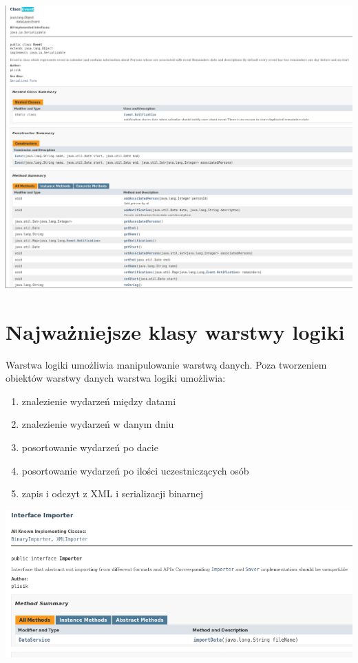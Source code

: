 \documentclass[a4paper,12pt]{article}
\begin{document}
\begin{minipage}{\textwidth}

    \includegraphics[width=\textwidth]{./screen/dataLayer/Event.png}
    \label{Event}

\end{minipage}


\section{Najważniejsze klasy warstwy logiki}
       Warstwa logiki umożliwia manipulowanie warstwą danych. Poza tworzeniem obiektów warstwy danych warstwa logiki umożliwia:
\begin{enumerate}
 \item znalezienie wydarzeń między datami
 \item znalezienie wydarzeń w danym dniu
 \item posortowanie wydarzeń po dacie 
 \item posortowanie wydarzeń po ilości uczestniczących osób
 \item zapis i odczyt z XML i serializacji binarnej 
\end{enumerate}

\begin{minipage}{\textwidth}

    \includegraphics[width=\textwidth]{./screen/logicLayer/Importer.png}
    \label{Importer}

\end{minipage}
\end{document}
